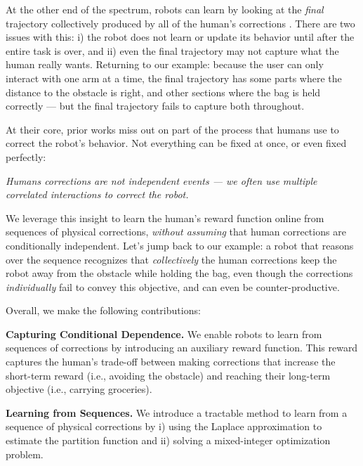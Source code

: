 At the other end of the spectrum, robots can learn by looking at the \textit{final} trajectory collectively produced by all of the human's corrections \cite{akgun2012keyframe, argall2009survey, osa2018algorithmic, ratliff2006maximum, jain2015learning}. There are two issues with this: i) the robot does not learn or update its behavior until after the entire task is over, and ii) even the final trajectory may not capture what the human really wants. Returning to our example: because the user can only interact with one arm at a time, the final trajectory has some parts where the distance to the obstacle is right, and other sections where the bag is held correctly --- but the final trajectory fails to capture both throughout.

At their core, prior works miss out on part of the process that humans use to correct the robot's behavior. Not everything can be fixed at once, or even fixed perfectly:
\begin{center}
\vspace{-0.5em}
    \textit{Humans corrections are not independent events --- we often use multiple correlated interactions to correct the robot.}
\vspace{-0.5em}
\end{center}
We leverage this insight to learn the human's reward function online from sequences of physical corrections, \textit{without assuming} that human corrections are conditionally independent. Let's jump back to our example: a robot that reasons over the sequence recognizes that \textit{collectively} the human corrections keep the robot away from the obstacle while holding the bag, even though the corrections \textit{individually} fail to convey this objective, and can even be counter-productive.

Overall, we make the following contributions:

\noindent\textbf{Capturing Conditional Dependence.} We enable robots to learn from sequences of corrections by introducing an auxiliary reward function. This reward captures the human's trade-off between making corrections that increase the short-term reward (i.e., avoiding the obstacle) and reaching their long-term objective (i.e., carrying groceries).

\smallskip

\noindent\textbf{Learning from Sequences.} We introduce a tractable method to learn from a sequence of physical corrections by i) using the Laplace approximation to estimate the partition function and ii) solving a mixed-integer optimization problem.

